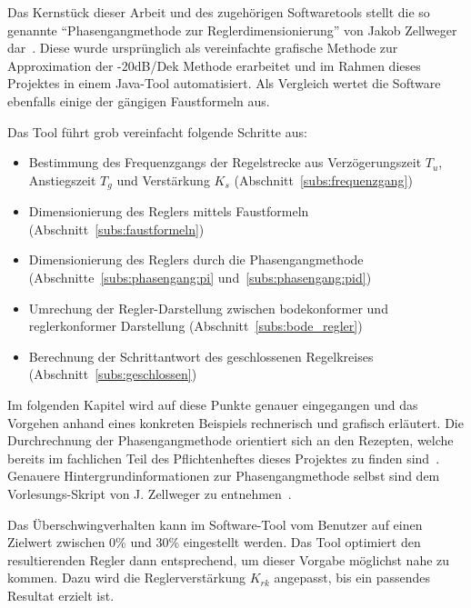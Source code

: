 Das  Kernst\"uck  dieser Arbeit  und  des  zugeh\"origen Softwaretools  stellt
die   so  genannte   ``Phasengangmethode   zur  Reglerdimensionierung''   von
Jakob   Zellweger   dar~\cite{regelungstechnik:zellweger_short}. Diese   wurde
urspr\"unglich  als  vereinfachte  grafische  Methode  zur  Approximation  der
-20dB/Dek Methode erarbeitet und im Rahmen dieses Projektes in einem Java-Tool
automatisiert. Als  Vergleich   wertet  die  Software  ebenfalls   einige  der
g\"angigen Faustformeln aus.

Das Tool f\"uhrt grob vereinfacht folgende Schritte aus:
\begin{itemize}
    \item
        Bestimmung des  Frequenzgangs der Regelstrecke  aus Verz\"ogerungszeit
        $T_u$,     Anstiegszeit     $T_g$      und     Verst\"arkung     $K_s$
        (Abschnitt~\ref{subs:frequenzgang})
    \item
        Dimensionierung       des      Reglers       mittels      Faustformeln
        (Abschnitt~\ref{subs:faustformeln})
    \item
        Dimensionierung    des    Reglers    durch    die    Phasengangmethode
        (Abschnitte~\ref{subs:phasengang:pi} und~\ref{subs:phasengang:pid})
    \item
        Umrechung   der   Regler-Darstellung    zwischen   bodekonformer   und
        reglerkonformer Darstellung (Abschnitt~\ref{subs:bode_regler})
    \item
        Berechnung   der   Schrittantwort   des   geschlossenen   Regelkreises
        (Abschnitt~\ref{subs:geschlossen})
\end{itemize}

Im   folgenden   Kapitel   wird   auf   diese   Punkte   genauer   eingegangen
und   das    Vorgehen   anhand    eines   konkreten    Beispiels   rechnerisch
und    grafisch   erl\"autert. Die    Durchrechnung   der    Phasengangmethode
orientiert     sich     an     den     Rezepten,     welche     bereits     im
fachlichen     Teil     des     Pflichtenheftes    dieses     Projektes     zu
finden  sind~\cite{ref:pflichtenheft}. Genauere  Hintergrundinformationen  zur
Phasengangmethode  selbst  sind  dem  Vorlesungs-Skript  von  J. Zellweger  zu
entnehmen~\cite{regelungstechnik:zellweger_short}.

Das  \"Uberschwingverhalten  kann  im  Software-Tool vom  Benutzer  auf  einen
Zielwert  zwischen 0\%  und 30\%  eingestellt werden. Das  Tool optimiert  den
resultierenden Regler  dann entsprechend,  um dieser Vorgabe  m\"oglichst nahe
zu  kommen. Dazu  wird die  Reglerverst\"arkung  $K_{rk}$  angepasst, bis  ein
passendes Resultat erzielt ist.

